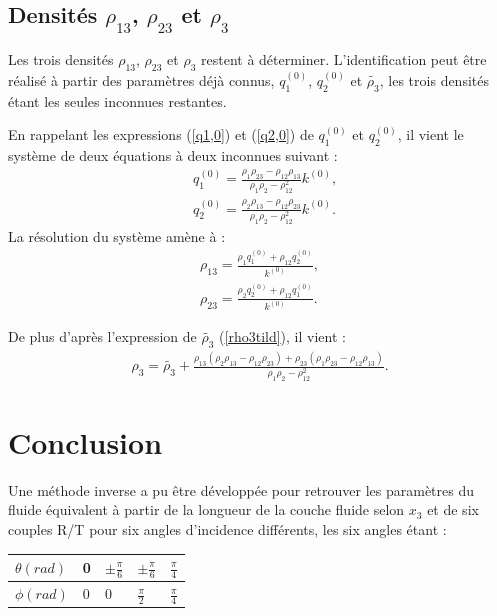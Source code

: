 \documentclass[twoside,openright]{report}
\begin{document}
\subsection{Densités $\rho_{13}$, $\rho_{23}$ et $\rho_3$}
\label{Ch_Inv_S_rho_SS_rho13/23/3}
    Les trois densités $\rho_{13}$, $\rho_{23}$ et $\rho_3$ restent à déterminer. L'identification peut être réalisé à partir des paramètres déjà connus, $q_1^{(0)}$, $q_2^{(0)}$ et $\tilde{\rho_3}$, les trois densités étant les seules inconnues restantes.
    
    En rappelant les expressions (\ref{q1,0}) et (\ref{q2,0}) de $q_1^{(0)}$ et $q_2^{(0)}$, il vient le système de deux équations à deux inconnues suivant :
    \begin{align*}
    &q_1^{(0)}=\frac{\rho_1\rho_{23}-\rho_{12}\rho_{13}}{\rho_1\rho_2-\rho_{12}^2}k^{(0)},\\
    &q_2^{(0)}=\frac{\rho_2\rho_{13}-\rho_{12}\rho_{23}}{\rho_1\rho_2-\rho_{12}^2}k^{(0)}.
    \end{align*}
    La résolution du système amène à :
    \begin{align*}
    \rho_{13}=\frac{\rho_1q_1^{(0)}+\rho_{12}q_2^{(0)}}{k^{(0)}},\\
    \rho_{23}=\frac{\rho_2q_2^{(0)}+\rho_{12}q_1^{(0)}}{k^{(0)}}.
    \end{align*}

    De plus d'après l'expression de $\tilde{\rho_3}$ (\ref{rho3tild}), il vient :
    \begin{align}
    \rho_3=\tilde{\rho_3}+\frac{\rho_{13}(\rho_2\rho_{13}-\rho_{12}\rho_{23})+\rho_{23}(\rho_1\rho_{23}-\rho_{12}\rho_{13})}{\rho_1\rho_2-\rho_{12}^2}.
    \end{align}
    
\section{Conclusion}
\label{Ch_Inv_S_Conc}
    Une méthode inverse a pu être développée pour retrouver les paramètres du fluide équivalent à partir de la longueur de la couche fluide selon $x_3$ et de six couples R/T pour six angles d'incidence différents, les six angles étant :\\
    \begin{tabular}{||m{3cm}||m{3cm}|m{3cm}|m{3cm}|m{3cm}|}
         \hline
         $\theta (rad)$ & 0 & $\pm\frac{\pi}{6}$ & $\pm\frac{\pi}{6}$ & $\frac{\pi}{4}$ \\ \hline 
          $\phi (rad)$ & 0 & 0 & $\frac{\pi}{2}$ & $\frac{\pi}{4}$
          \\ \hline
    \end{tabular}\\
    
\end{document}
